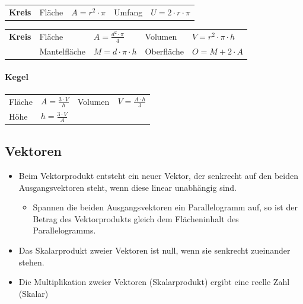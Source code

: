 \documentclass[
a4paper,
oneside,
landscape, 
8pt,
]{scrartcl}
\begin{document}
\begin{multicols*}{2}
\begin{tabbing}
	\begin{tabu} to \linewidth {l l X l X}
		\textbf{Kreis} & Fläche & $A = r^2 \cdot \pi$ & 
		Umfang & $U = 2 \cdot r \cdot \pi$ \\
	\end{tabu}
\end{tabbing}


\begin{tabbing}
	\begin{tabu} to \linewidth {l l X l X}
		\textbf{Kreis} &  Fläche & $A = \frac{d^2 \cdot \pi}{4}$ &
		Volumen & $V = r^2 \cdot \pi \cdot h $ \\
		& Mantelfläche & $M = d \cdot \pi \cdot h$ &
		Oberfläche & $O = M + 2 \cdot A $ \\
		\bottomrule
	\end{tabu}
\end{tabbing}

\paragraph{Kegel}
\begin{tabbing}
	\begin{tabu} to \linewidth {l X l X}
		\toprule
		Fläche & $A = \frac{3 \cdot V}{h}$ &
		Volumen & $V = \frac{A \cdot h}{3}$ \\
		Höhe & $h = \frac{3 \cdot V}{A}$ & & \\
		\bottomrule
	\end{tabu}
\end{tabbing}

\subsection{Vektoren}

\begin{itemize}
	\item Beim Vektorprodukt entsteht ein neuer Vektor, der senkrecht auf den beiden Ausgangsvektoren steht, wenn diese linear unabhängig sind.
	\begin{itemize}
		\item Spannen die beiden Ausgangsvektoren ein Parallelogramm auf, so ist der Betrag des Vektorprodukts gleich dem Flächeninhalt des Parallelogramms.
	\end{itemize}
	\item Das Skalarprodukt zweier Vektoren ist null, wenn sie senkrecht zueinander stehen.
	\item Die Multiplikation zweier Vektoren (Skalarprodukt) ergibt eine reelle Zahl (Skalar)
\end{itemize}


\end{multicols*}
\end{document}
